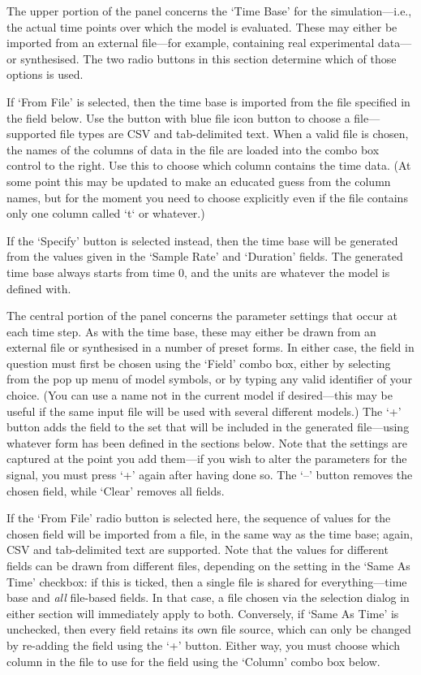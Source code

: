 \documentclass[a4paper,11pt]{article}
\begin{document}
The upper portion of the panel concerns the `Time Base' for the simulation---i.e., the actual time points over which the model is evaluated. These may either be imported from an external file---for example, containing real experimental data---or synthesised. The two radio buttons in this section determine which of those options is used.

If `From File' is selected, then the time base is imported from the file specified in the field below. Use the button with blue file icon button to choose a file---supported file types are CSV and tab-delimited text. When a valid file is chosen, the names of the columns of data in the file are loaded into the combo box control to the right. Use this to choose which column contains the time data. (At some point this may be updated to make an educated guess from the column names, but for the moment you need to choose explicitly even if the file contains only one column called `t` or whatever.)

If the `Specify' button is selected instead, then the time base will be generated from the values given in the `Sample Rate' and `Duration' fields. The generated time base always starts from time 0, and the units are whatever the model is defined with.

The central portion of the panel concerns the parameter settings that occur at each time step. As with the time base, these may either be drawn from an external file or synthesised in a number of preset forms. In either case, the field in question must first be chosen using the `Field' combo box, either by selecting from the pop up menu of model symbols, or by typing any valid identifier of your choice. (You can use a name not in the current model if desired---this may be useful if the same input file will be used with several different models.) The `+' button adds the field to the set that will be included in the generated file---using whatever form has been defined in the sections below. Note that the settings are captured at the point you add them---if you wish to alter the parameters for the signal, you must press `+' again after having done so. The `--' button removes the chosen field, while `Clear' removes all fields.

If the `From File' radio button is selected here, the sequence of values for the chosen field will be imported from a file, in the same way as the time base; again, CSV and tab-delimited text are supported. Note that the values for different fields can be drawn from different files, depending on the setting in the `Same As Time' checkbox: if this is ticked, then a single file is shared for everything---time base and \textit{all} file-based fields. In that case, a file chosen via the selection dialog in either section will immediately apply to both. Conversely, if `Same As Time' is unchecked, then every field retains its own file source, which can only be changed by re-adding the field using the `+' button. Either way, you must choose which column in the file to use for the field using the `Column' combo box below.
\end{document}
